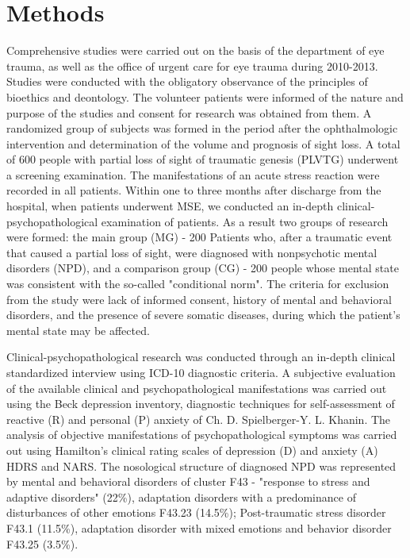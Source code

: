 \documentclass[twocolumn]{article}
\begin{document}
\section{Methods}
\par Comprehensive studies were carried out on the basis of the department of eye trauma, as well as the office of urgent care for eye trauma during 2010-2013. Studies were conducted with the obligatory observance of the principles of bioethics and deontology. The volunteer patients were informed of the nature and purpose of the studies and consent for research was obtained from them. A randomized group of subjects was formed in the period after the ophthalmologic intervention and determination of the volume and prognosis of sight loss. A total of 600 people with partial loss of sight of traumatic genesis (PLVTG) underwent a screening examination. The manifestations of an acute stress reaction were recorded in all patients. Within one to three months after discharge from the hospital, when patients underwent MSE, we conducted an in-depth clinical-psychopathological examination of patients. As a result two groups of research were formed: the main group (MG) - 200 Patients who, after a traumatic event that caused a partial loss of sight, were diagnosed with nonpsychotic mental disorders (NPD), and a comparison group (CG) - 200 people whose mental state was consistent with the so-called "conditional norm". The criteria for exclusion from the study were lack of informed consent, history of mental and behavioral disorders, and the presence of severe somatic diseases, during which the patient's mental state may be affected.
\par Clinical-psychopathological research was conducted through an in-depth clinical standardized interview using ICD-10 diagnostic criteria. A subjective evaluation of the available clinical and psychopathological manifestations was carried out using the Beck depression inventory\cite{bib9}, diagnostic techniques for self-assessment of reactive (R) and personal (P) anxiety of Ch. D. Spielberger-Y. L. Khanin\cite{bib10}. The analysis of objective manifestations of psychopathological symptoms was carried out using Hamilton’s clinical rating scales of depression (D) and anxiety (A) HDRS and NARS\cite{bib11}. The nosological structure of diagnosed NPD was represented by mental and behavioral disorders of cluster F43 - "response to stress and adaptive disorders" (22\%), adaptation disorders with a predominance of disturbances of other emotions F43.23 (14.5\%); Post-traumatic stress disorder F43.1 (11.5\%), adaptation disorder with mixed emotions and behavior disorder F43.25 (3.5\%).
\end{document}
